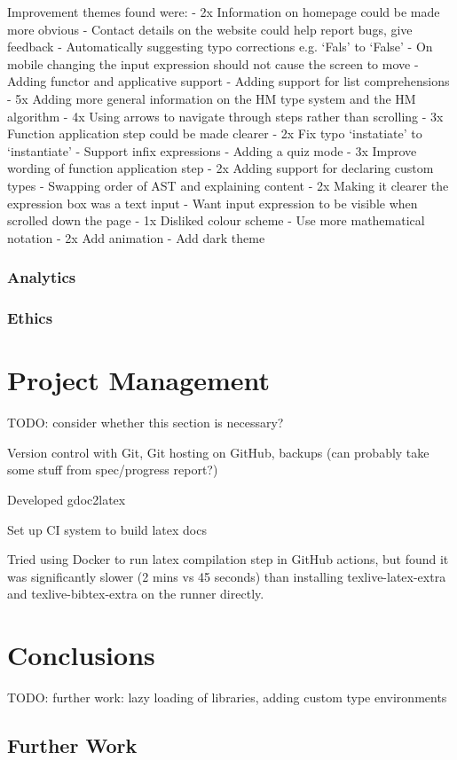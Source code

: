 \documentclass[a4paper,fleqn,12pt]{article}
\begin{document}
Improvement themes found were:
- 2x Information on homepage could be made more obvious
- Contact details on the website could help report bugs, give feedback
- Automatically suggesting typo corrections e.g. ‘Fals’ to ‘False’
- On mobile changing the input expression should not cause the screen to move
- Adding functor and applicative support
- Adding support for list comprehensions
- 5x Adding more general information on the HM type system and the HM algorithm
- 4x Using arrows to navigate through steps rather than scrolling
- 3x Function application step could be made clearer
- 2x Fix typo ‘instatiate’ to ‘instantiate’
- Support infix expressions
- Adding a quiz mode
- 3x Improve wording of function application step
- 2x Adding support for declaring custom types
- Swapping order of AST and explaining content
- 2x Making it clearer the expression box was a text input
- Want input expression to be visible when scrolled down the page
- 1x Disliked colour scheme
- Use more mathematical notation
- 2x Add animation
- Add dark theme
\subsubsection{Analytics}\label{id:h.67g05flyfv0z}
\subsubsection{Ethics}\label{id:h.q5st3bb4afm1}
\section{Project Management}\label{id:h.3j8xp631ygy}
TODO: consider whether this section is necessary?

Version control with Git, Git hosting on GitHub, backups (can probably take some stuff from spec/progress report?)

Developed gdoc2latex

Set up CI system to build latex docs

Tried using Docker to run latex compilation step in GitHub actions, but found it was significantly slower (2 mins vs 45 seconds) than installing texlive-latex-extra and texlive-bibtex-extra on the runner directly.
\section{Conclusions}\label{id:h.fc67ipatea73}
TODO: further work: lazy loading of libraries, adding custom type environments
\subsection{Further Work}\label{id:h.60yvcrl0lpu}
\end{document}
